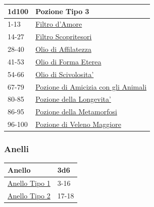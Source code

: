 \begin{multicols}{2}
{\medskip\hypertarget{Pozione Tipo 3}{}

{\small\begin{tabular}{ll}
		\toprule
\textbf{1d100} & \textbf{Pozione Tipo 3}\\
\toprule
1-13& \hyperlink{Filtro d'Amore}{Filtro d'Amore}\\
14-27 & \hyperlink{Filtro Scopritesori}{Filtro Scopritesori}\\
28-40 & \hyperlink{Olio di Affilatezza}{Olio di Affilatezza}\\
41-53 & \hyperlink{Olio di Forma Eterea}{Olio di Forma Eterea}\\
54-66 & \hyperlink{Olio di Scivolosita'}{Olio di Scivolosita'}\\
67-79 & \hyperlink{Pozione di Amicizia congli Animali}{Pozione di Amicizia con gli Animali}\\
80-85 & \hyperlink{Pozione della Longevita'}{Pozione della Longevita'}\\
86-95 & \hyperlink{Pozione della Metamorfosi}{Pozione della Metamorfosi}\\
96-100&\hyperlink{pozionifiltri}{Pozione di Veleno Maggiore}
\end{tabular}}

\subsubsection{Anelli}\hypertarget{anellimagici}{}\label{anellimagici}

{\small\begin{tabular}{ll}
		\toprule
\textbf{Anello}&\textbf{3d6}\\
\toprule
\hyperlink{Pozione Tipo 3}{Anello Tipo 1} &3-16\\
\hyperlink{Pozione Tipo 3}{Anello Tipo 2} &17-18
\end{tabular}}

\medskip\hypertarget{Anello Tipo 1}{}

}
\end{multicols}
